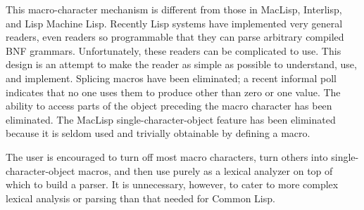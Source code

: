 \beforenoterule
\begin{incompatibility}
This macro-character mechanism is different from
those in MacLisp, Interlisp, and Lisp Machine Lisp.  Recently Lisp systems have
implemented very general readers, even readers so programmable that they
can parse arbitrary compiled {BNF} grammars.  Unfortunately, these
readers can be complicated to use.  This design is an attempt to make the
reader as simple as possible to understand, use, and implement.
Splicing macros have been eliminated; a recent informal poll indicates
that no one uses them to produce other than zero or one value.  The
ability to access parts of the object preceding the macro character has
been eliminated.  The MacLisp single-character-object feature has been
eliminated because it is seldom used and trivially obtainable by
defining a macro.

The user is encouraged to turn off most macro characters, turn
others into single-character-object macros, and then use 
purely as a lexical analyzer on top of which to build a parser.
It is unnecessary, however, to cater to more complex lexical analysis
or parsing than that needed for Common Lisp.
\end{incompatibility}
\afternoterule

